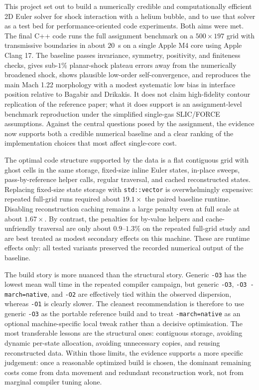 \documentclass[final,3p,times,twocolumn]{elsarticle}
\begin{document}
This project set out to build a numerically credible and computationally efficient 2D Euler solver for shock interaction with a helium bubble, and to use that solver as a test bed for performance-oriented code experiments. Both aims were met. The final C++ code runs the full assignment benchmark on a $500 \times 197$ grid with transmissive boundaries in about $20$~s on a single Apple M4 core using Apple Clang 17. The baseline passes invariance, symmetry, positivity, and finiteness checks, gives sub-$1\%$ planar-shock plateau errors away from the numerically broadened shock, shows plausible low-order self-convergence, and reproduces the main Mach 1.22 morphology with a modest systematic low bias in interface position relative to Bagabir and Drikakis. It does not claim high-fidelity contour replication of the reference paper; what it does support is an assignment-level benchmark reproduction under the simplified single-gas SLIC/FORCE assumptions. Against the central questions posed by the assignment, the evidence now supports both a credible numerical baseline and a clear ranking of the implementation choices that most affect single-core cost.

The optimal code structure supported by the data is a flat contiguous grid with ghost cells in the same storage, fixed-size inline Euler states, in-place sweeps, pass-by-reference helper calls, regular traversal, and cached reconstructed states. Replacing fixed-size state storage with \texttt{std::vector} is overwhelmingly expensive: repeated full-grid runs required about $19.1\times$ the paired baseline runtime. Disabling reconstruction caching remains a large penalty even at full scale at about $1.67\times$. By contrast, the penalties for by-value helpers and cache-unfriendly traversal are only about $0.9$--$1.3\%$ on the repeated full-grid study and are best treated as modest secondary effects on this machine. These are runtime effects only: all tested variants preserved the recorded numerical output of the baseline.

The build story is more nuanced than the structural story. Generic \texttt{-O3} has the lowest mean wall time in the repeated compiler campaign, but generic \texttt{-O3}, \texttt{-O3 -march=native}, and \texttt{-O2} are effectively tied within the observed dispersion, whereas \texttt{-O1} is clearly slower. The cleanest recommendation is therefore to use generic \texttt{-O3} as the portable reference build and to treat \texttt{-march=native} as an optional machine-specific local tweak rather than a decisive optimisation. The most transferable lessons are the structural ones: contiguous storage, avoiding dynamic per-state allocation, avoiding unnecessary copies, and reusing reconstructed data. Within those limits, the evidence supports a more specific judgement: once a reasonable optimized build is chosen, the dominant remaining costs come from data movement and redundant reconstruction work, not from marginal compiler tuning alone.
\end{document}
